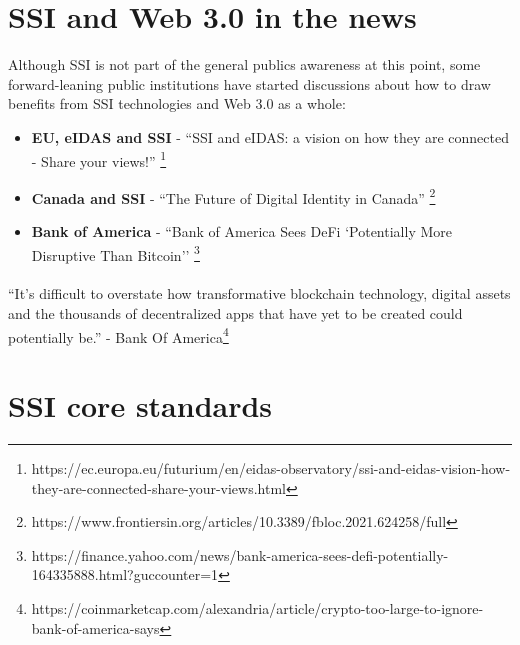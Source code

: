 \pagebreak





\hypertarget{ssi-and-web-3.0-in-the-news}{%
\section{SSI and Web 3.0 in the
news}\label{ssi-and-web-3.0-in-the-news}}

Although SSI is not part of the general publics awareness at this point,
some forward-leaning public institutions have started discussions about
how to draw benefits from SSI technologies and Web 3.0 as a whole:
\begin{itemize}
\tightlist
\item
    \textbf{EU, eIDAS and SSI} - ``SSI and eIDAS: a vision on how they are connected - Share your views!'' \footnote{https://ec.europa.eu/futurium/en/eidas-observatory/ssi-and-eidas-vision-how-they-are-connected-share-your-views.html}
\item
    \textbf{Canada and SSI} - ``The Future of Digital Identity in Canada'' \footnote{https://www.frontiersin.org/articles/10.3389/fbloc.2021.624258/full}
\item
    \textbf{Bank of America} - ``Bank of America Sees DeFi `Potentially More Disruptive Than Bitcoin'' \footnote{https://finance.yahoo.com/news/bank-america-sees-defi-potentially-164335888.html?guccounter=1}
\end{itemize}

\paragraph{}

``It's difficult to overstate how transformative blockchain
technology, digital assets and the thousands of decentralized apps that
have yet to be created could potentially be.'' - Bank Of America\footnote{https://coinmarketcap.com/alexandria/article/crypto-too-large-to-ignore-bank-of-america-says}


\hypertarget{ssi-core-standards}{%
\section{SSI core standards}\label{ssi-core-standards}}

